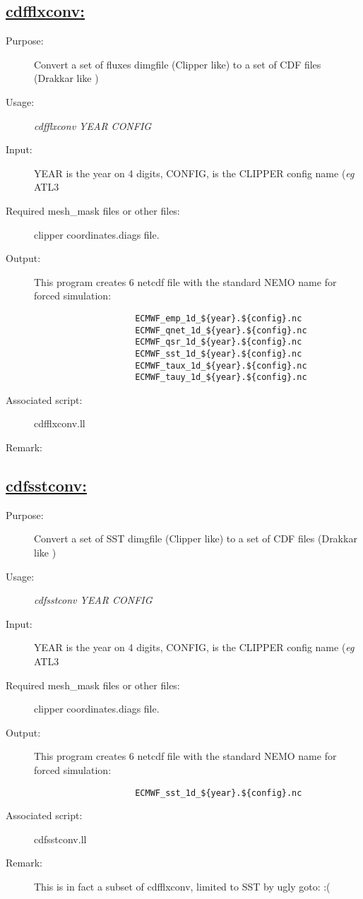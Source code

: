 \documentclass[a4paper,11pt]{article}
\begin{document}
\subsection*{\underline{cdfflxconv:}}
\begin{description}
\item[Purpose:]  Convert a set of fluxes dimgfile (Clipper like)
                 to a set of CDF files (Drakkar like )
\item[Usage:] {\em cdfflxconv  YEAR CONFIG }
\item[Input:]  YEAR is the year on 4 digits, CONFIG, is the CLIPPER config name ({\it eg} ATL3
\item[Required mesh\_mask files or other files:] clipper coordinates.diags file.
\item[Output:] This program creates 6 netcdf file with the standard NEMO name for forced simulation:\\
\begin{verbatim}
                    ECMWF_emp_1d_${year}.${config}.nc
                    ECMWF_qnet_1d_${year}.${config}.nc
                    ECMWF_qsr_1d_${year}.${config}.nc
                    ECMWF_sst_1d_${year}.${config}.nc
                    ECMWF_taux_1d_${year}.${config}.nc
                    ECMWF_tauy_1d_${year}.${config}.nc
\end{verbatim}
\item[Associated script:] cdfflxconv.ll
\item[Remark:]
\end{description}

\newpage
\subsection*{\underline{cdfsstconv:}}
\begin{description}
\item[Purpose:]  Convert a set of SST dimgfile (Clipper like)
                 to a set of CDF files (Drakkar like )
\item[Usage:] {\em cdfsstconv  YEAR CONFIG }
\item[Input:]  YEAR is the year on 4 digits, CONFIG, is the CLIPPER config name ({\it eg} ATL3
\item[Required mesh\_mask files or other files:] clipper coordinates.diags file.
\item[Output:] This program creates 6 netcdf file with the standard NEMO name for forced simulation:\\
\begin{verbatim}
                    ECMWF_sst_1d_${year}.${config}.nc
\end{verbatim}
\item[Associated script:] cdfsstconv.ll
\item[Remark:] This is in fact a subset of cdfflxconv, limited to SST by ugly goto: :(
\end{description}
\end{document}
